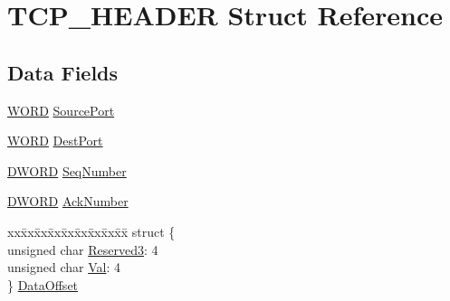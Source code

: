 \hypertarget{struct_t_c_p___h_e_a_d_e_r}{}\section{T\+C\+P\+\_\+\+H\+E\+A\+D\+E\+R Struct Reference}
\label{struct_t_c_p___h_e_a_d_e_r}
\subsection*{Data Fields}
\begin{DoxyCompactItemize}
\item 
\hyperlink{_generic_type_defs_8h_a2b0e863dadf920709ec53d9088ee7c91}{W\+O\+R\+D} \hyperlink{struct_t_c_p___h_e_a_d_e_r_af4e15f4e54c10b261e4587c0651d635f}{Source\+Port}
\item 
\hyperlink{_generic_type_defs_8h_a2b0e863dadf920709ec53d9088ee7c91}{W\+O\+R\+D} \hyperlink{struct_t_c_p___h_e_a_d_e_r_acbdf56a7b422c7c574cd0d399ae9434a}{Dest\+Port}
\item 
\hyperlink{_generic_type_defs_8h_ad342ac907eb044443153a22f964bf0af}{D\+W\+O\+R\+D} \hyperlink{struct_t_c_p___h_e_a_d_e_r_a09bdc0d5beae9f460788baec2d455a75}{Seq\+Number}
\item 
\hyperlink{_generic_type_defs_8h_ad342ac907eb044443153a22f964bf0af}{D\+W\+O\+R\+D} \hyperlink{struct_t_c_p___h_e_a_d_e_r_abc8c237ba79d8186d8cb3de7df3a131a}{Ack\+Number}
\item 
\begin{tabbing}
xx\=xx\=xx\=xx\=xx\=xx\=xx\=xx\=xx\=\kill
struct \{\\
\>unsigned char \hyperlink{struct_t_c_p___h_e_a_d_e_r_a34c940d4eee891fd1a8ac0c77091d1cb}{Reserved3}: 4\\
\>unsigned char \hyperlink{struct_t_c_p___h_e_a_d_e_r_a5822b7000f077dc1e2f88a31a6b89a39}{Val}: 4\\
\} \hyperlink{struct_t_c_p___h_e_a_d_e_r_a57bf620571057a239c31978ce012adfa}{DataOffset}\\


\end{tabbing}
\end{DoxyCompactItemize}

